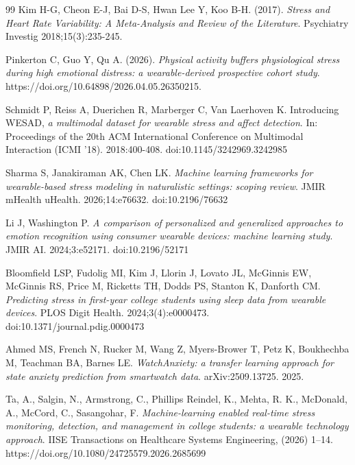 \documentclass[11pt, a4paper, oneside]{article}
\begin{document}
\begin{thebibliography}{99}
Kim H-G, Cheon E-J, Bai D-S, Hwan Lee Y, Koo B-H.  (2017). \textit{Stress and Heart Rate Variability: A Meta-Analysis and Review of the Literature}. Psychiatry Investig 2018;15(3):235-245.

Pinkerton C, Guo Y, Qu A.  (2026). \textit{Physical activity buffers physiological stress during high emotional distress: a wearable-derived prospective cohort study}. https://doi.org/10.64898/2026.04.05.26350215.

Schmidt P, Reiss A, Duerichen R, Marberger C, Van Laerhoven K. Introducing WESAD, \textit{a multimodal dataset for wearable stress and affect detection}. In: Proceedings of the 20th ACM International Conference on Multimodal Interaction (ICMI '18). 2018:400-408. doi:10.1145/3242969.3242985

Sharma S, Janakiraman AK, Chen LK. \textit{Machine learning frameworks for wearable-based stress modeling in naturalistic settings: scoping review}. JMIR mHealth uHealth. 2026;14:e76632. doi:10.2196/76632

Li J, Washington P. \textit{A comparison of personalized and generalized approaches to emotion recognition using consumer wearable devices: machine learning study}. JMIR AI. 2024;3:e52171. doi:10.2196/52171

Bloomfield LSP, Fudolig MI, Kim J, Llorin J, Lovato JL, McGinnis EW, McGinnis RS, Price M, Ricketts TH, Dodds PS, Stanton K, Danforth CM. \textit{Predicting stress in first-year college students using sleep data from wearable devices}. PLOS Digit Health. 2024;3(4):e0000473. doi:10.1371/journal.pdig.0000473

Ahmed MS, French N, Rucker M, Wang Z, Myers-Brower T, Petz K, Boukhechba M, Teachman BA, Barnes LE. \textit{WatchAnxiety: a transfer learning approach for state anxiety prediction from smartwatch data}. arXiv:2509.13725. 2025.

Ta, A., Salgin, N., Armstrong, C., Phillips Reindel, K., Mehta, R. K., McDonald, A., McCord, C., Sasangohar, F. \textit{Machine-learning enabled real-time stress monitoring, detection, and management in college students: a wearable technology approach}. IISE Transactions on Healthcare Systems Engineering, (2026) 1–14. https://doi.org/10.1080/24725579.2026.2685699


\end{thebibliography}
\end{document}
